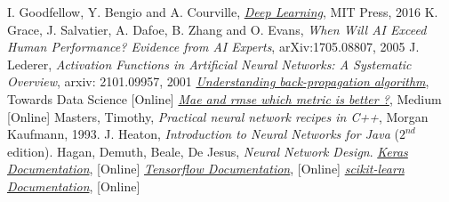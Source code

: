 \begin{thebibliography}{9}
 I. Goodfellow, Y. Bengio and A. Courville, \href{http://www.deeplearningbook.org}{\emph{Deep Learning}}, MIT Press, 2016
K. Grace, J. Salvatier, A. Dafoe, B. Zhang and O. Evans, \emph{When Will AI Exceed Human Performance? Evidence from AI Experts}, arXiv:1705.08807, 2005
 J. Lederer, \emph{Activation Functions in Artificial Neural Networks: A Systematic Overview}, arxiv: 2101.09957, 2001
\href{https://towardsdatascience.com/understanding-backpropagation-algorithm-7bb3aa2f95fd}{\emph{Understanding back-propagation algorithm}}, Towards Data Science [Online]
\href{https://medium.com/human-in-a-machine-world/mae-and-rmse-which-metric-is-better-e60ac3bde13d}{\emph{Mae and rmse which metric is better ?}}, Medium [Online]
 Masters, Timothy, \emph{Practical neural network recipes in C++}, Morgan Kaufmann, 1993.
 J. Heaton, \emph{Introduction to Neural Networks for Java} ($2^{nd}$ edition).
 Hagan, Demuth, Beale, De Jesus, \emph{Neural Network Design}.
\href{https://keras.io/}{\emph{Keras Documentation}}, [Online]  
\href{https://www.tensorflow.org/}{\emph{Tensorflow Documentation}}, [Online] 
\href{https://scikit-learn.org/stable/}{\emph{scikit-learn Documentation}}, [Online]
\end{thebibliography}